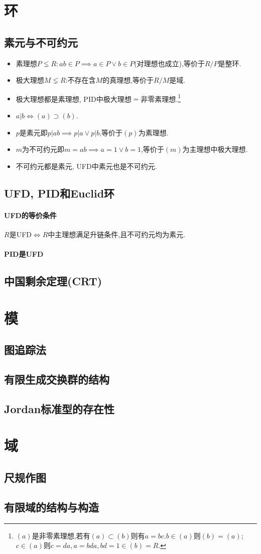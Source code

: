 \documentclass{article}
\begin{document}
\section{环}
\subsection{素元与不可约元}
\begin{itemize}
    \item 素理想$P\lneq R: ab\in P\implies a\in P\lor b\in P$(对理想也成立),等价于$R/P$是整环.
    \item 极大理想$M\lneq R$:不存在含$M$的真理想,等价于$R/M$是域.
    \item 极大理想都是素理想, PID中极大理想$=$非零素理想.\footnote{$(a)$是非零素理想,若有$(a)\subset (b)$则有$a=bc$.$b\in (a)$则$(b)=(a)$;$c\in (a)$则$c=da, a=bda, bd=1\in (b)=R$.}
    \item $a|b\iff (a)\supset (b)$.
    \item $p$是素元即$p|ab\implies p|a\lor p|b$,等价于$(p)$为素理想.
    \item $m$为不可约元即$m=ab\implies a=1\lor b=1$,等价于$(m)$为主理想中极大理想.
    \item 不可约元都是素元, UFD中素元也是不可约元.
\end{itemize}
\subsection{UFD, PID和Euclid环}
\paragraph{UFD的等价条件}$R$是UFD$\iff R$中主理想满足升链条件,且不可约元均为素元.
\paragraph{PID是UFD}

\subsection{中国剩余定理(CRT)}

\section{模}
\subsection{图追踪法}

\subsection{有限生成交换群的结构}

\subsection{Jordan标准型的存在性}

\section{域}
\subsection{尺规作图}

\subsection{有限域的结构与构造}
\end{document}
